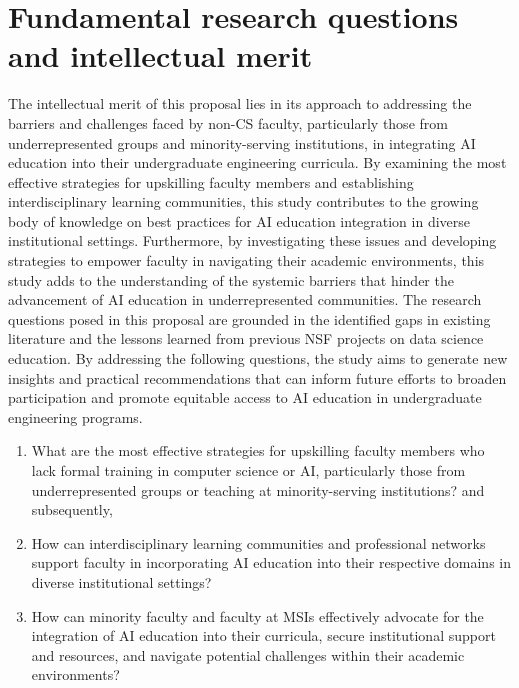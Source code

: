\documentclass[11pt]{article}
\begin{document}
\section{Fundamental research questions and intellectual merit} 
The intellectual merit of this proposal lies in its approach to addressing the barriers and challenges faced by non-CS faculty, particularly those from underrepresented groups and minority-serving institutions, in integrating AI education into their undergraduate engineering curricula. By examining the most effective strategies for upskilling faculty members and establishing interdisciplinary learning communities, this study contributes to the growing body of knowledge on best practices for AI education integration in diverse institutional settings.
Furthermore, by investigating these issues and developing strategies to empower faculty in navigating their academic environments, this study adds to the understanding of the systemic barriers that hinder the advancement of AI education in underrepresented communities.
The research questions posed in this proposal are grounded in the identified gaps in existing literature and the lessons learned from previous NSF projects on data science education. By addressing the following questions, the study aims to generate new insights and practical recommendations that can inform future efforts to broaden participation and promote equitable access to AI education in undergraduate engineering programs.

\begin{tcolorbox}[colback=mycmykcolor, colframe=black, boxrule=1pt, coltext=black]
\begin{enumerate}
    \item What are the most effective strategies for upskilling faculty members who lack formal training in computer science or AI, particularly those from underrepresented groups or teaching at minority-serving institutions? and subsequently, 

    \item How can interdisciplinary learning communities and professional networks support faculty in incorporating AI education into their respective domains in diverse institutional settings? 

    \item How can minority faculty and faculty at MSIs effectively advocate for the integration of AI education into their curricula, secure institutional support and resources, and navigate potential challenges within their academic environments?

\end{enumerate}
\end{tcolorbox}
\end{document}
